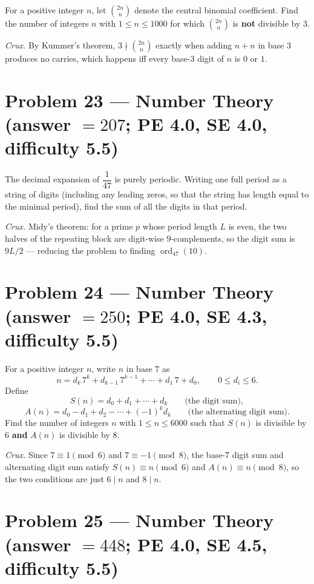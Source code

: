 \documentclass[11pt]{article}
\begin{document}
For a positive integer $n$, let $\binom{2n}{n}$ denote the central binomial coefficient. Find the number of integers $n$ with $1 \le n \le 1000$ for which $\binom{2n}{n}$ is \textbf{not} divisible by $3$.

\medskip

\textit{Crux.} By Kummer's theorem, $3 \nmid \binom{2n}{n}$ exactly when adding $n+n$ in base $3$ produces no carries, which happens iff every base-3 digit of $n$ is $0$ or $1$.

\section*{Problem 23 --- Number Theory \quad (answer $=207$; PE 4.0, SE 4.0, difficulty 5.5)}

The decimal expansion of $\dfrac{1}{47}$ is purely periodic. Writing one full period as a string of digits (including any leading zeros, so that the string has length equal to the minimal period), find the sum of all the digits in that period.

\medskip

\textit{Crux.} Midy's theorem: for a prime $p$ whose period length $L$ is even, the two halves of the repeating block are digit-wise $9$-complements, so the digit sum is $9L/2$ — reducing the problem to finding $\operatorname{ord}_{47}(10)$.

\section*{Problem 24 --- Number Theory \quad (answer $=250$; PE 4.0, SE 4.3, difficulty 5.5)}

For a positive integer $n$, write $n$ in base $7$ as
$$n = d_k\,7^k + d_{k-1}\,7^{k-1} + \cdots + d_1\,7 + d_0,\qquad 0\le d_i\le 6.$$
Define
$$S(n) = d_0 + d_1 + \cdots + d_k \qquad\text{(the digit sum)},$$
$$A(n) = d_0 - d_1 + d_2 - \cdots + (-1)^k d_k \qquad\text{(the alternating digit sum)}.$$
Find the number of integers $n$ with $1 \le n \le 6000$ such that $S(n)$ is divisible by $6$ \textbf{and} $A(n)$ is divisible by $8$.

\medskip

\textit{Crux.} Since $7\equiv 1\pmod 6$ and $7\equiv -1\pmod 8$, the base-7 digit sum and alternating digit sum satisfy $S(n)\equiv n\pmod 6$ and $A(n)\equiv n\pmod 8$, so the two conditions are just $6\mid n$ and $8\mid n$.

\section*{Problem 25 --- Number Theory \quad (answer $=448$; PE 4.0, SE 4.5, difficulty 5.5)}
\end{document}
